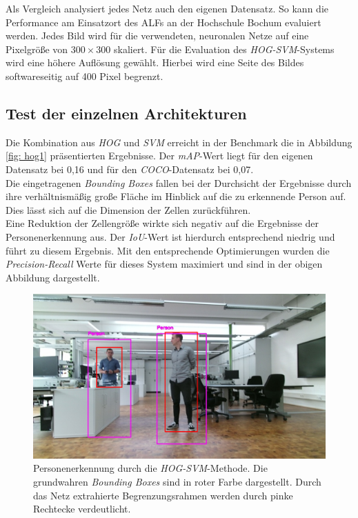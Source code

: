 Als Vergleich analysiert jedes Netz auch den eigenen Datensatz. So kann die Performance am Einsatzort des ALFs an der Hochschule Bochum evaluiert werden. Jedes Bild wird für die verwendeten, neuronalen Netze auf eine Pixelgröße von $300 \times 300$ skaliert. Für die Evaluation des \textit{HOG-SVM}-Systems wird eine höhere Auflösung gewählt. Hierbei wird eine Seite des Bildes softwareseitig auf 400 Pixel begrenzt.

\subsection{Test der einzelnen Architekturen}

Die Kombination aus \textit{HOG} und \textit{SVM} erreicht in der Benchmark die in Abbildung \ref{fig: hog1} präsentierten Ergebnisse. Der \textit{mAP}-Wert liegt für den eigenen Datensatz bei 0,16 und für den \textit{COCO}-Datensatz bei 0,07.\\






 Die eingetragenen \textit{Bounding Boxes} fallen bei der Durchsicht der Ergebnisse durch ihre verhältnismäßig große Fläche im Hinblick auf die zu erkennende Person auf. Dies lässt sich auf die Dimension der Zellen zurückführen.\\
 
 Eine Reduktion der Zellengröße wirkte sich negativ auf die Ergebnisse der Personenerkennung aus. Der \textit{IoU}-Wert ist hierdurch entsprechend niedrig und führt zu diesem Ergebnis. Mit den entsprechende Optimierungen wurden die \textit{Precision-Recall} Werte für dieses System maximiert und sind in der obigen Abbildung dargestellt.\\
	\begin{figure}[H]
	\centering
	\includegraphics[width=1\textwidth]{Bilder/iouhog.png}
	\caption{Personenerkennung durch die \textit{HOG-SVM}-Methode. Die grundwahren \textit{Bounding Boxes} sind in roter Farbe dargestellt. Durch das Netz extrahierte Begrenzungsrahmen werden durch pinke Rechtecke verdeutlicht.}
	\label{fig: hogiou}
\end{figure}

